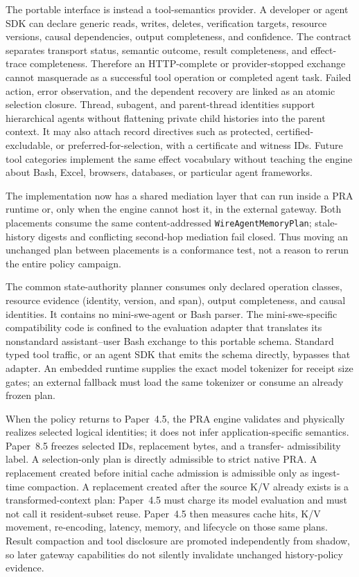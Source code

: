 \documentclass[11pt]{article}
\begin{document}
The portable interface is instead a tool-semantics provider. A developer or
agent SDK can declare generic reads, writes, deletes, verification targets,
resource versions, causal dependencies, output completeness, and confidence.
The contract separates transport status, semantic outcome, result completeness,
and effect-trace completeness.  Therefore an HTTP-complete or provider-stopped
exchange cannot masquerade as a successful tool operation or completed agent
task.  Failed action, error observation, and the dependent recovery are linked
as an atomic selection closure.  Thread, subagent, and parent-thread identities
support hierarchical agents without flattening private child histories into the
parent context.
It may also attach record directives such as protected, certified-excludable,
or preferred-for-selection, with a certificate and witness IDs. Future tool
categories implement the same effect vocabulary without teaching the engine
about Bash, Excel, browsers, databases, or particular agent frameworks.

The implementation now has a shared mediation layer that can run inside a PRA
runtime or, only when the engine cannot host it, in the external gateway. Both
placements consume the same content-addressed
\texttt{WireAgent\-Memory\-Plan}; stale-history digests and conflicting second-hop
mediation fail closed. Thus moving an unchanged plan between placements is a
conformance test, not a reason to rerun the entire policy campaign.

The common state-authority planner consumes only declared operation classes,
resource evidence (identity, version, and span), output completeness, and causal identities. It
contains no mini-swe-agent or Bash parser. The mini-swe-specific compatibility
code is confined to the evaluation adapter that translates its nonstandard
assistant--user Bash exchange to this portable schema. Standard typed tool
traffic, or an agent SDK that emits the schema directly, bypasses that adapter.
An embedded runtime supplies the exact model tokenizer for receipt size gates;
an external fallback must load the same tokenizer or consume an already frozen
plan.

When the policy returns to Paper~4.5, the PRA engine validates and physically
realizes selected logical identities; it does not infer application-specific
semantics. Paper~8.5 freezes selected IDs, replacement bytes, and a transfer-
admissibility label.  A selection-only plan is directly admissible to strict
native PRA.  A replacement created before initial cache admission is admissible
only as ingest-time compaction.  A replacement created after the source K/V
already exists is a transformed-context plan: Paper~4.5 must charge its model
evaluation and must not call it resident-subset reuse. Paper~4.5 then measures
cache hits, K/V movement, re-encoding, latency, memory, and lifecycle on those
same plans. Result compaction and tool disclosure are promoted independently
from shadow, so later gateway capabilities do not silently invalidate unchanged
history-policy evidence.
\end{document}
